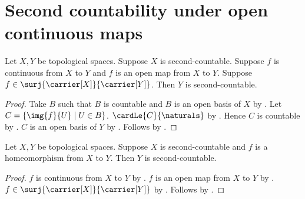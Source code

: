 \section{Second countability under open continuous maps}




\begin{theorem}\label{open_continuous_surjection_preserves_second_countability}
    Let $X,Y$ be topological spaces.
    Suppose $X$ is second-countable.
    Suppose $f$ is continuous from $X$ to $Y$ and $f$ is an open map from $X$ to $Y$.
    Suppose $f\in\surj{\carrier[X]}{\carrier[Y]}$.
    Then $Y$ is second-countable.
\end{theorem}
\begin{proof}
    Take $B$ such that $B$ is countable and $B$ is an open basis of $X$
        by .
    Let $C=\{\img{f}{U}\mid U\in B\}$.
    $\cardLe{C}{\naturals}$ by .
    Hence $C$ is countable by .
    $C$ is an open basis of $Y$ by .
    Follows by .
\end{proof}

\begin{corollary}\label{homeomorphism_preserves_second_countability}
    Let $X,Y$ be topological spaces.
    Suppose $X$ is second-countable and $f$ is a homeomorphism from $X$ to $Y$.
    Then $Y$ is second-countable.
\end{corollary}
\begin{proof}
    $f$ is continuous from $X$ to $Y$ by .
    $f$ is an open map from $X$ to $Y$ by .
    $f\in\surj{\carrier[X]}{\carrier[Y]}$ by .
    Follows by .
\end{proof}
